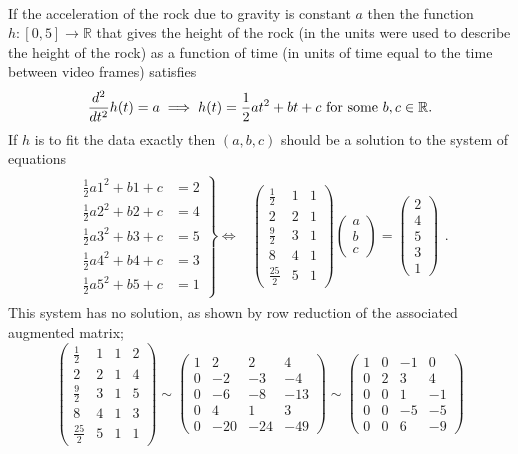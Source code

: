 \documentclass[12pt]{article}
\def\R{{\mathbb{R}}}
\def\b{\beta}
\def\bea{\begin{eqnarray}}
\def\eea{\end{eqnarray}}
\def\nn{\nonumber}
\def\baa{\left(\begin{array}{ccc}}
\def\eaa{\end{array}\right) }
\def\bv{\left(\begin{array}{c}}
\def\ev{\end{array}\right) }
\def\LR{\Leftrightarrow}
\begin{document}
\\
If the acceleration of the rock due to gravity is constant $a$ then the function $h:[0,5]\to \R$ that gives the height of the rock (in the units were used to describe the height of the rock) as a function of time (in units of time equal to the time between video frames) satisfies 
\[ \frac{d^2}{dt^2} h(t)=a \implies h(t)=\frac12 a t^2+bt+c {\rm ~for~some ~}b,c\in \R.\]
If $h$ is to fit the data exactly then $(a,b,c)$ should be a solution to the system of equations 
\bea \nn
\begin{array}{cc}
\left.
\begin{array}{cc}
\frac12a 1^2+b1+c &= 2 \\
\frac12a 2^2+b2+c &= 4 \\
\frac12a 3^2+b3+c &= 5 \\
\frac12a 4^2+b4+c &= 3 \\
\frac12a 5^2+b5+c &= 1 
\end{array}
\right\}\LR
& 
\baa
\frac12 &1&1\\
2&2&1\\
\frac92 &3&1\\
8&4&1\\
\frac{25}{2} &5&1
\eaa
\bv a\\b\\c \ev = \bv 2\\4\\5\\3\\1\ev
\end{array}.
\eea
This system has no solution, as shown by row reduction of the associated augmented matrix; 
\[
\left( \begin{array}{rrr|c}
\frac12 &1&1&2\\
2&2&1&4\\
\frac92 &3&1&5\\
8&4&1&3\\
\frac{25}{2} &5&1&1
\end{array} \right)
\sim 
\left( \begin{array}{rrr|r}
1 &2&2&4\\
0      &-2&-3&-4\\
0&-6&-8&-13\\
0&4&1&3\\
0&-20&-24&-49
\end{array} \right)
%
\sim 
\left( \begin{array}{rrr|r}
1 &0&-1&0\\
0      &2&3&4\\
0&0&1&-1\\
0&0&-5&-5\\
0&0&6&-9
\end{array} \right)
\]
\end{document}
